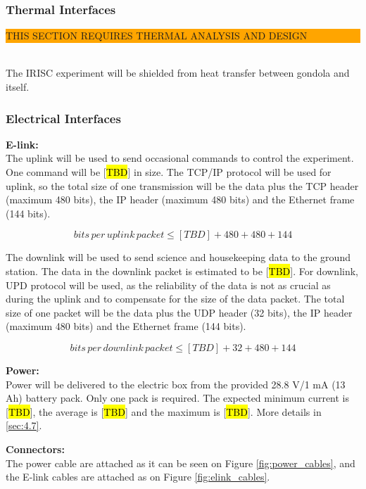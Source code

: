 % 


\subsubsection{Thermal Interfaces}

\colorbox{orange}{\parbox{\textwidth}{THIS SECTION REQUIRES THERMAL ANALYSIS AND DESIGN}}\\

The IRISC experiment will be shielded from heat transfer between gondola and itself.

\label{sec:4.2.2}


\subsubsection{Electrical Interfaces}
\label{sec:4.2.3}
\textbf{E-link:}\\
The uplink will be used to send occasional commands to control the experiment. One command will be [\hl{TBD}] in size. The TCP/IP protocol will be used for uplink, so the total size of one transmission will be the data plus the TCP header (maximum 480 bits), the IP header (maximum 480 bits) and the Ethernet frame (144 bits). 

$$ bits\, per\, uplink\, packet \leq [TBD] + 480 + 480 + 144 $$

The downlink will be used to send science and housekeeping data to the ground station. The data in the downlink packet is estimated to be [\hl{TBD}]. For downlink, UPD protocol will be used, as the reliability of the data is not as crucial as during the uplink and to compensate for the size of the data packet. The total size of one packet will be the data plus the UDP header (32 bits), the IP header (maximum 480 bits) and the Ethernet frame (144 bits).

$$ bits\, per\, downlink\, packet \leq [TBD] + 32 + 480 + 144 $$

\textbf{Power:}\\

Power will be delivered to the electric box from the provided 28.8 V/1 mA (13 Ah) battery pack. Only one pack is required. The expected minimum current is [\hl{TBD}], the average is [\hl{TBD}] and the maximum is [\hl{TBD}]. More details in \ref{sec:4.7}.

\textbf{Connectors:}\\
The power cable are attached as it can be seen on Figure \ref{fig:power_cables}, and the E-link cables are attached as on Figure \ref{fig:elink_cables}.

